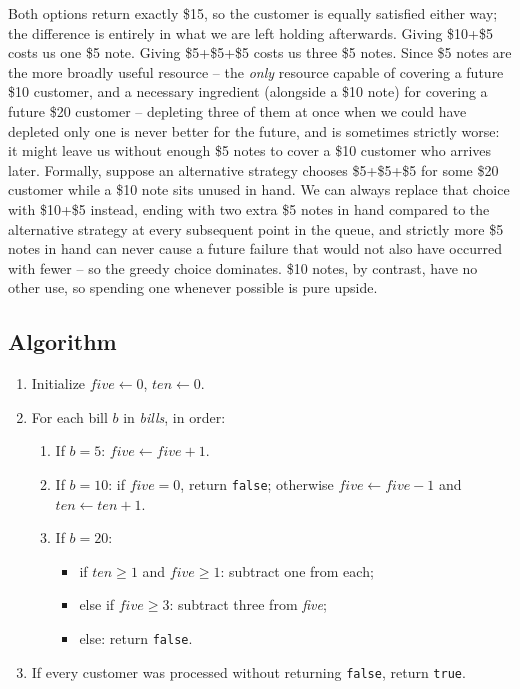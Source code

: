Both options return exactly \$15, so the customer is equally satisfied
either way; the difference is entirely in what we are left holding
afterwards. Giving \$10+\$5 costs us one \$5 note. Giving \$5+\$5+\$5 costs
us three \$5 notes. Since \$5 notes are the more broadly useful resource --
the \emph{only} resource capable of covering a future \$10 customer, and a
necessary ingredient (alongside a \$10 note) for covering a future \$20
customer -- depleting three of them at once when we could have depleted only
one is never better for the future, and is sometimes strictly worse: it
might leave us without enough \$5 notes to cover a \$10 customer who arrives
later. Formally, suppose an alternative strategy chooses \$5+\$5+\$5 for some
\$20 customer while a \$10 note sits unused in hand. We can always replace
that choice with \$10+\$5 instead, ending with two extra \$5 notes in hand
compared to the alternative strategy at every subsequent point in the queue,
and strictly more \$5 notes in hand can never cause a future failure that
would not also have occurred with fewer -- so the greedy choice dominates.
\$10 notes, by contrast, have no other use, so spending one whenever
possible is pure upside.

\subsection*{Algorithm}

\begin{enumerate}
  \item Initialize $\textit{five} \gets 0$, $\textit{ten} \gets 0$.
  \item For each bill $b$ in \textit{bills}, in order:
  \begin{enumerate}
    \item If $b = 5$: $\textit{five} \gets \textit{five} + 1$.
    \item If $b = 10$: if $\textit{five} = 0$, return \texttt{false};
          otherwise $\textit{five} \gets \textit{five} - 1$ and
          $\textit{ten} \gets \textit{ten} + 1$.
    \item If $b = 20$:
    \begin{itemize}
      \item if $\textit{ten} \ge 1$ and $\textit{five} \ge 1$: subtract one
            from each;
      \item else if $\textit{five} \ge 3$: subtract three from
            \textit{five};
      \item else: return \texttt{false}.
    \end{itemize}
  \end{enumerate}
  \item If every customer was processed without returning \texttt{false},
        return \texttt{true}.
\end{enumerate}


